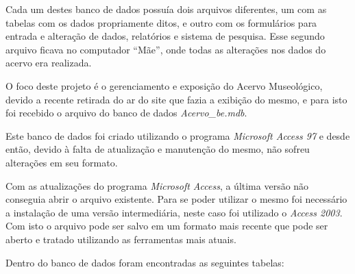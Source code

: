 \documentclass[a4paper,12pt,oneside,onecolumn,final,fleqn]{repUERJ}
\begin{document}
Cada um destes banco de dados possuía dois arquivos diferentes, um com as tabelas com os dados propriamente ditos, e outro com os formulários para entrada e alteração de dados, relatórios e sistema de pesquisa. Esse segundo arquivo ficava no computador ``Mãe'', onde todas as alterações nos dados do acervo era realizada.

O foco deste projeto é o gerenciamento e exposição do Acervo Museológico, devido a recente retirada do ar do site que fazia a exibição do mesmo, e para isto foi recebido o arquivo do banco de dados \textit{Acervo\_be.mdb}.

Este banco de dados foi criado utilizando o programa \textit{Microsoft Access 97} e desde então, devido à falta de atualização e manutenção do mesmo, não sofreu alterações em seu formato.

Com as atualizações do programa \textit{Microsoft Access}, a última versão não conseguia abrir o arquivo existente. Para se poder utilizar o mesmo foi necessário a instalação de uma versão intermediária, neste caso foi utilizado o \textit{Access 2003}. Com isto o arquivo pode ser salvo em um formato mais recente que pode ser aberto e tratado utilizando as ferramentas mais atuais.

Dentro do banco de dados foram encontradas as seguintes tabelas:
\end{document}
